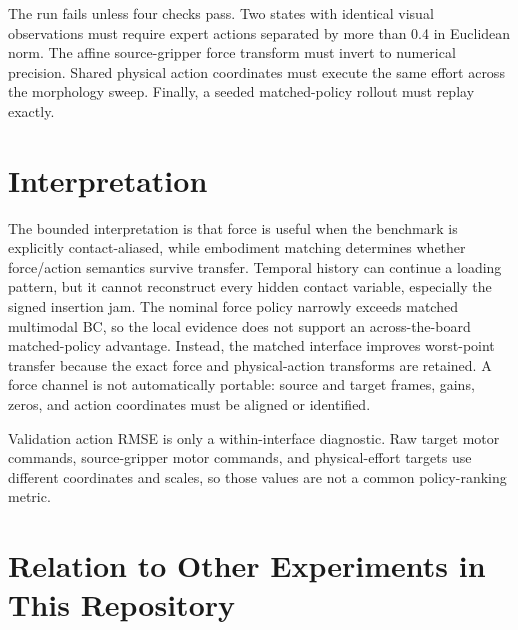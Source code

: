 \documentclass[11pt]{article}
\begin{document}
The run fails unless four checks pass. Two states with identical visual observations must require expert actions separated by more than 0.4 in Euclidean norm. The affine source-gripper force transform must invert to numerical precision. Shared physical action coordinates must execute the same effort across the morphology sweep. Finally, a seeded matched-policy rollout must replay exactly.

\section{Interpretation}

The bounded interpretation is that force is useful when the benchmark is explicitly contact-aliased, while embodiment matching determines whether force/action semantics survive transfer. Temporal history can continue a loading pattern, but it cannot reconstruct every hidden contact variable, especially the signed insertion jam. The nominal force policy narrowly exceeds matched multimodal BC, so the local evidence does not support an across-the-board matched-policy advantage. Instead, the matched interface improves worst-point transfer because the exact force and physical-action transforms are retained. A force channel is not automatically portable: source and target frames, gains, zeros, and action coordinates must be aligned or identified.

Validation action RMSE is only a within-interface diagnostic. Raw target motor commands, source-gripper motor commands, and physical-effort targets use different coordinates and scales, so those values are not a common policy-ranking metric.

\section{Relation to Other Experiments in This Repository}
\end{document}
